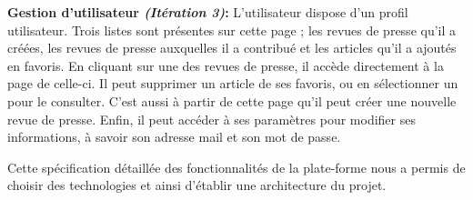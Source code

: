 	\textbf{Gestion d'utilisateur \textit{(Itération 3)}:} L'utilisateur dispose d'un profil utilisateur. Trois listes sont présentes sur cette page ; les revues de presse qu'il a créées, les revues de presse auxquelles il a contribué et les articles qu'il a ajoutés en favoris. En cliquant sur une des revues de presse, il accède directement à la page de celle-ci. Il peut supprimer un article de ses favoris, ou en sélectionner un pour le consulter. C'est aussi à partir de cette page qu'il peut créer une nouvelle revue de presse. Enfin, il peut accéder à ses paramètres pour modifier ses informations, à savoir son adresse mail et son mot de passe.

Cette spécification détaillée des fonctionnalités de la plate-forme nous a permis de choisir des technologies et ainsi d'établir une architecture du projet.